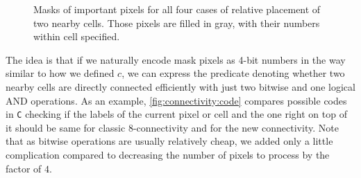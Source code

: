 \documentclass[hidelinks]{llncs}
\renewcommand{\C}{\texttt{C} \xspace}
\begin{document}
\begin{figure}
  \centering
  \begin{subfigure}[t]{0.2\linewidth}
    \centering
  \end{subfigure}
  \begin{subfigure}[t]{0.2\linewidth}
    \centering
  \end{subfigure}
  \begin{subfigure}[t]{0.2\linewidth}
    \centering
  \end{subfigure}
  \begin{subfigure}[t]{0.25\linewidth}
    \centering
  \end{subfigure}
  \caption{Masks of important pixels for all four cases of relative placement
  of two nearby cells. Those pixels are filled in gray, with their numbers within
  cell specified.}
  \label{fig:connectivity:masks}
\end{figure}

The idea is that if we naturally encode mask pixels as 4-bit numbers in the
way similar to how we defined $c$, we can express the predicate denoting whether
two nearby cells
are directly connected efficiently with just two bitwise and one logical AND
operations.
As an example, \autoref{fig:connectivity:code} compares possible codes in \C
checking if the labels of the current pixel or cell and the one right on top of
it should be same for classic $8$-connectivity and for the new connectivity. Note
that as bitwise operations are usually relatively cheap, we added only a little
complication compared to decreasing the number of pixels to process by the
factor of $4$.
\end{document}
